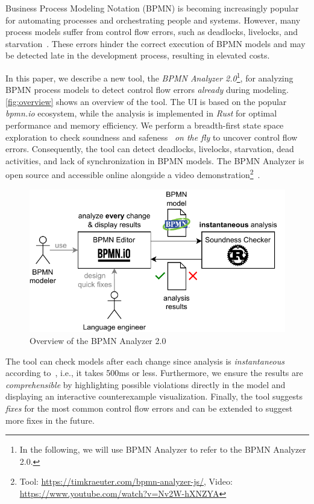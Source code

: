 \documentclass[onecolumn]{ceurart}
\begin{document}
Business Process Modeling Notation (BPMN) is becoming increasingly popular for automating processes and orchestrating people and systems.
However, many process models suffer from control flow errors, such as deadlocks, livelocks, and starvation~\cite{fahlandAnalysisDemandInstantaneous2011}.
These errors hinder the correct execution of BPMN models and may be detected late in the development process, resulting in elevated costs.

In this paper, we describe a new tool, the \textit{BPMN Analyzer 2.0}\footnote{
In the following, we will use BPMN Analyzer to refer to the BPMN Analyzer 2.0.}, for analyzing BPMN process models to detect control flow errors \textit{already} during modeling.
\autoref{fig:overview} shows an overview of the tool.
The UI is based on the popular \textit{bpmn.io} ecosystem, while the analysis is implemented in \textit{Rust} for optimal performance and memory efficiency.
We perform a breadth-first state space exploration to check soundness and safeness~\cite{corradiniClassificationBPMNCollaborations2018} \textit{on the fly} to uncover control flow errors.
Consequently, the tool can detect deadlocks, livelocks, starvation, dead activities, and lack of synchronization in BPMN models.
The BPMN Analyzer is open source and accessible online alongside a video demonstration\footnote{Tool: \url{https://timkraeuter.com/bpmn-analyzer-js/}, Video: \url{https://www.youtube.com/watch?v=Nv2W-hXNZYA}}~\cite{krauterInstantaneousComprehensibleFixable2024}.

\begin{figure}[ht]
	\centering
	\includegraphics[width=0.6\linewidth]{images/overview}
	\caption{Overview of the BPMN Analyzer 2.0}
	\label{fig:overview}
\end{figure}

The tool can check models after each change since analysis is \textit{instantaneous} according to~\cite{fahlandAnalysisDemandInstantaneous2011}, i.e., it takes 500ms or less.
Furthermore, we ensure the results are \textit{comprehensible} by highlighting possible violations directly in the model and displaying an interactive counterexample visualization.
Finally, the tool suggests \textit{fixes} for the most common control flow errors and can be extended to suggest more fixes in the future.
\end{document}

